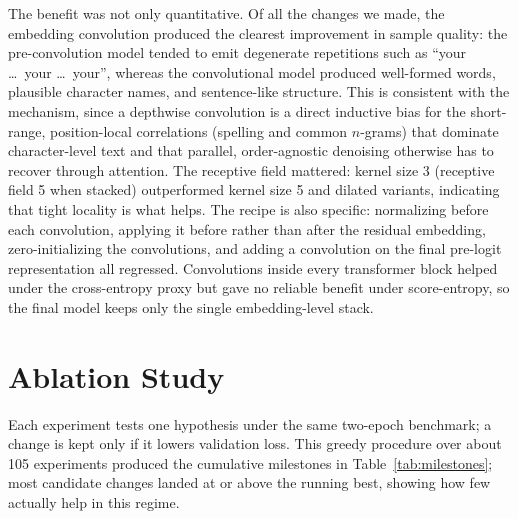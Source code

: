 \documentclass[11pt]{article}
\begin{document}
The benefit was not only quantitative. Of all the changes we made, the embedding
convolution produced the clearest improvement in sample quality: the
pre-convolution model tended to emit degenerate repetitions such as
``your \ldots\ your \ldots\ your'', whereas the convolutional model produced
well-formed words, plausible character names, and sentence-like structure. This
is consistent with the mechanism, since a depthwise convolution is a direct
inductive bias for the short-range, position-local correlations (spelling and
common $n$-grams) that dominate character-level text and that parallel,
order-agnostic denoising otherwise has to recover through attention. The
receptive field mattered: kernel size 3 (receptive field 5 when stacked)
outperformed kernel size 5 and dilated variants, indicating that tight locality
is what helps. The recipe is also specific: normalizing before each convolution,
applying it before rather than after the residual embedding, zero-initializing
the convolutions, and adding a convolution on the final pre-logit representation
all regressed. Convolutions inside every transformer block helped under the
cross-entropy proxy but gave no reliable benefit under score-entropy, so the
final model keeps only the single embedding-level stack.

\section{Ablation Study}
\label{sec:ablation}

Each experiment tests one hypothesis under the same two-epoch benchmark; a change
is kept only if it lowers validation loss. This greedy procedure over about 105
experiments produced the cumulative milestones in Table~\ref{tab:milestones};
most candidate changes landed at or above the running best, showing how few
actually help in this regime.
\end{document}
